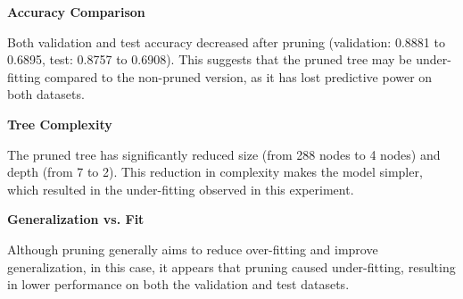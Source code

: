 \documentclass[11pt]{article}
\begin{document}
\begin{enumerate}
\textbf{Accuracy Comparison}
    
    Both validation and test accuracy decreased after pruning (validation: 0.8881 to 0.6895, test: 0.8757 to 0.6908). This suggests that the pruned tree may be under-fitting compared to the non-pruned version, as it has lost predictive power on both datasets.

\textbf{Tree Complexity}

    The pruned tree has significantly reduced size (from 288 nodes to 4 nodes) and depth (from 7 to 2). This reduction in complexity makes the model simpler, which resulted in the under-fitting observed in this experiment.

\textbf{Generalization vs. Fit}

    Although pruning generally aims to reduce over-fitting and improve generalization, in this case, it appears that pruning caused under-fitting, resulting in lower performance on both the validation and test datasets.
    

\end{enumerate}
\end{document}
